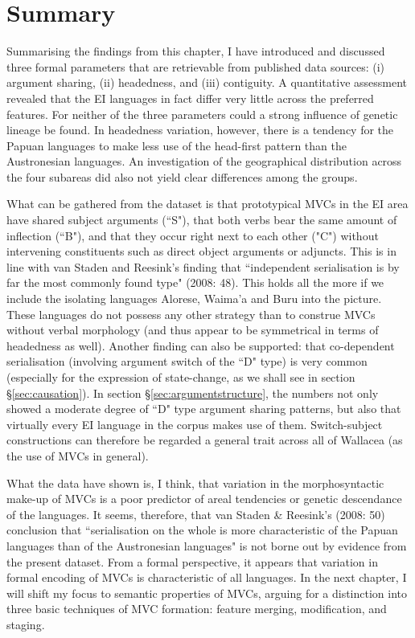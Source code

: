 \section{Summary}

Summarising the findings from this chapter, I have introduced and discussed three formal parameters that are retrievable from published data sources: (i) argument sharing, (ii) headedness, and (iii) contiguity. A quantitative assessment revealed that the EI languages in fact differ very little across the preferred features. For neither of the three parameters could a strong influence of genetic lineage be found. In headedness variation, however, there is a tendency for the Papuan languages to make less use of the head-first pattern than the Austronesian languages. An investigation of the geographical distribution across the four subareas did also not yield clear differences among the groups.

What can be gathered from the dataset is that prototypical MVCs in the EI area have shared subject arguments (``S"), that both verbs bear the same amount of inflection (``B"), and that they occur right next to each other ("C") without intervening constituents such as direct object arguments or adjuncts. This is in line with van Staden and Reesink's finding that ``independent serialisation is by far the most commonly found type" (2008: 48). This holds all the more if we include the isolating languages Alorese, Waima'a and Buru into the picture. These languages do not possess any other strategy than to construe MVCs without verbal morphology (and thus appear to be symmetrical in terms of headedness as well). Another finding can also be supported: that co-dependent serialisation (involving argument switch of the ``D" type) is very common (especially for the expression of state-change, as we shall see in section §\ref{sec:causation}). In section §\ref{sec:argumentstructure}, the numbers not only showed a moderate degree of ``D" type argument sharing patterns, but also that virtually every EI language in the corpus makes use of them. Switch-subject constructions can therefore be regarded a general trait across all of Wallacea (as the use of MVCs in general).

What the data have shown is, I think, that variation in the morphosyntactic make-up of MVCs is a poor predictor of areal tendencies or genetic descendance of the languages. It seems, therefore, that van Staden \& Reesink's (2008: 50) conclusion that ``serialisation on the whole is more characteristic of the Papuan languages than of the Austronesian languages" is not borne out by evidence from the present dataset. From a formal perspective, it appears that variation in formal encoding of MVCs is characteristic of all languages. In the next chapter, I will shift my focus to semantic properties of MVCs, arguing for a distinction into three basic techniques of MVC formation: feature merging, modification, and staging.